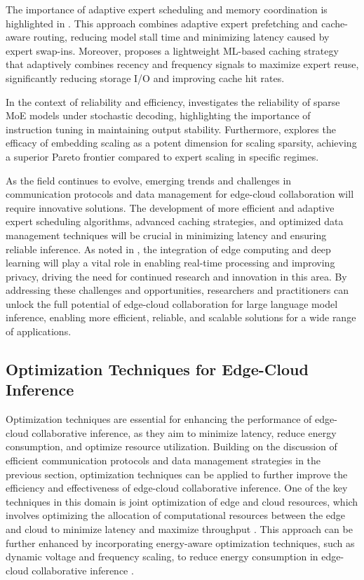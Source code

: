 \documentclass[11pt,a4paper]{article}
\begin{document}
The importance of adaptive expert scheduling and memory coordination is highlighted in \cite{arxiv:2510.26730}. This approach combines adaptive expert prefetching and cache-aware routing, reducing model stall time and minimizing latency caused by expert swap-ins. Moreover, \cite{arxiv:2601.17063} proposes a lightweight ML-based caching strategy that adaptively combines recency and frequency signals to maximize expert reuse, significantly reducing storage I/O and improving cache hit rates.

In the context of reliability and efficiency, \cite{arxiv:2601.00942} investigates the reliability of sparse MoE models under stochastic decoding, highlighting the importance of instruction tuning in maintaining output stability. Furthermore, \cite{arxiv:2601.21204} explores the efficacy of embedding scaling as a potent dimension for scaling sparsity, achieving a superior Pareto frontier compared to expert scaling in specific regimes.

As the field continues to evolve, emerging trends and challenges in communication protocols and data management for edge-cloud collaboration will require innovative solutions. The development of more efficient and adaptive expert scheduling algorithms, advanced caching strategies, and optimized data management techniques will be crucial in minimizing latency and ensuring reliable inference. As noted in \cite{arxiv:2204.03326}, the integration of edge computing and deep learning will play a vital role in enabling real-time processing and improving privacy, driving the need for continued research and innovation in this area. By addressing these challenges and opportunities, researchers and practitioners can unlock the full potential of edge-cloud collaboration for large language model inference, enabling more efficient, reliable, and scalable solutions for a wide range of applications.


\subsection{Optimization Techniques for Edge-Cloud Inference}


Optimization techniques are essential for enhancing the performance of edge-cloud collaborative inference, as they aim to minimize latency, reduce energy consumption, and optimize resource utilization. Building on the discussion of efficient communication protocols and data management strategies in the previous section, optimization techniques can be applied to further improve the efficiency and effectiveness of edge-cloud collaborative inference. One of the key techniques in this domain is joint optimization of edge and cloud resources, which involves optimizing the allocation of computational resources between the edge and cloud to minimize latency and maximize throughput \cite{doi:10.1109/twc.2022.3165824}. This approach can be further enhanced by incorporating energy-aware optimization techniques, such as dynamic voltage and frequency scaling, to reduce energy consumption in edge-cloud collaborative inference \cite{doi:10.1109/access.2024.3409745}.
\end{document}
